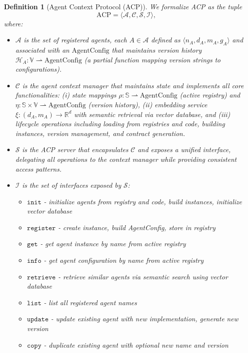 \documentclass[11pt]{article}
\newtheorem{definition}{Definition}
\begin{document}
\begin{definition}[Agent Context Protocol (ACP)]
We formalize ACP as the tuple
\[ \mathrm{ACP} = \langle \mathcal{A}, \mathcal{C}, \mathcal{S}, \mathcal{I} \rangle, \]
where:
\begin{itemize}[leftmargin=*,itemsep=0.1em]
  \item $\mathcal{A}$ is the set of registered agents, each $A \in \mathcal{A}$ defined as $\langle n_A, d_A, m_A, g_A \rangle$ and associated with an $\mathrm{AgentConfig}$ that maintains version history $\mathcal{H}_A: \mathbb{V} \rightharpoonup \mathrm{AgentConfig}$ (a partial function mapping version strings to configurations).
  \item $\mathcal{C}$ is the agent context manager that maintains state and implements all core functionalities: (i) state mappings $\rho: \mathbb{S} \rightharpoonup \mathrm{AgentConfig}$ (active registry) and $\eta: \mathbb{S} \times \mathbb{V} \rightharpoonup \mathrm{AgentConfig}$ (version history), (ii) embedding service $\xi: (d_A, m_A) \to \mathbb{R}^d$ with semantic retrieval via vector database, and (iii) lifecycle operations including loading from registries and code, building instances, version management, and contract generation.
  \item $\mathcal{S}$ is the ACP server that encapsulates $\mathcal{C}$ and exposes a unified interface, delegating all operations to the context manager while providing consistent access patterns.
  \item $\mathcal{I}$ is the set of interfaces exposed by $\mathcal{S}$:
  \begin{itemize}[leftmargin=*,itemsep=0.05em]
    \item $\mathtt{init}$ - initialize agents from registry and code, build instances, initialize vector database
    \item $\mathtt{register}$ - create instance, build AgentConfig, store in registry
    \item $\mathtt{get}$ - get agent instance by name from active registry
    \item $\mathtt{info}$ - get agent configuration by name from active registry
    \item $\mathtt{retrieve}$ - retrieve similar agents via semantic search using vector database
    \item $\mathtt{list}$ - list all registered agent names
    \item $\mathtt{update}$ - update existing agent with new implementation, generate new version
    \item $\mathtt{copy}$ - duplicate existing agent with optional new name and version

\end{itemize}
\end{itemize}
\end{definition}
\end{document}
